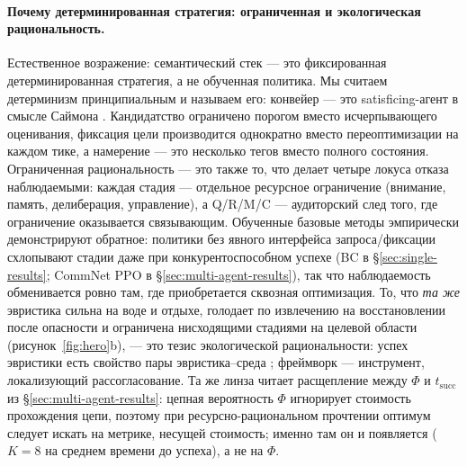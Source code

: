 \documentclass{article}
\begin{document}
\paragraph{Почему детерминированная стратегия: ограниченная и экологическая рациональность.}
Естественное возражение: семантический стек --- это фиксированная детерминированная стратегия, а не обученная политика. Мы считаем детерминизм принципиальным и называем его: конвейер --- это satisficing-агент в смысле Саймона \citep{simon1955behavioral,simon1956rational}. Кандидатство ограничено порогом вместо исчерпывающего оценивания, фиксация цели производится однократно вместо переоптимизации на каждом тике, а намерение --- это несколько тегов вместо полного состояния. Ограниченная рациональность --- это также то, что делает четыре локуса отказа наблюдаемыми: каждая стадия --- отдельное ресурсное ограничение (внимание, память, делиберация, управление), а Q/R/M/C --- аудиторский след того, где ограничение оказывается связывающим. Обученные базовые методы эмпирически демонстрируют обратное: политики без явного интерфейса запроса/фиксации схлопывают стадии даже при конкурентоспособном успехе (BC в \S\ref{sec:single-results}; CommNet PPO в \S\ref{sec:multi-agent-results}), так что наблюдаемость обменивается ровно там, где приобретается сквозная оптимизация. То, что \emph{та же} эвристика сильна на воде и отдыхе, голодает по извлечению на восстановлении после опасности и ограничена нисходящими стадиями на целевой области (рисунок~\ref{fig:hero}b), --- это тезис экологической рациональности: успех эвристики есть свойство пары эвристика--среда \citep{simon1956rational,gigerenzer1996reasoning}; фреймворк --- инструмент, локализующий рассогласование. Та же линза читает расщепление между $\Phi$ и $t_{\mathrm{succ}}$ из \S\ref{sec:multi-agent-results}: цепная вероятность $\Phi$ игнорирует стоимость прохождения цепи, поэтому при ресурсно-рациональном прочтении \citep{lieder2020resource} оптимум следует искать на метрике, несущей стоимость; именно там он и появляется ($K{=}8$ на среднем времени до успеха), а не на $\Phi$.
\end{document}
